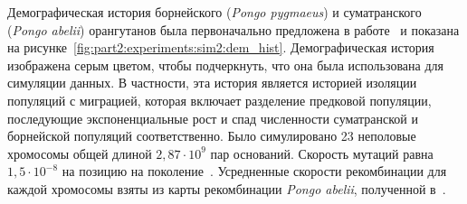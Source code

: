 

Демографическая история борнейского (\textit{Pongo pygmaeus}) и суматранского (\textit{Pongo abelii}) орангутанов была первоначально предложена в работе~\cite{locke2011comparative} и показана на рисунке~\ref{fig:part2:experiments:sim2:dem_hist}.
Демографическая история изображена серым цветом, чтобы подчеркнуть, что она была использована для симуляции данных.
В частности, эта история является историей изоляции популяций с миграцией, которая включает разделение предковой популяции, последующие экспоненциальные рост и спад численности суматранской и борнейской популяций соответственно.
Было симулировано 23 неполовые хромосомы общей длиной $2{,}87\cdot 10^9$ пар оснований.
Скорость мутаций равна $1{,}5\cdot 10^{-8}$ на позицию на поколение~\cite{nater2017morphometric}.
Усредненные скорости рекомбинации для каждой хромосомы взяты из карты рекомбинации \textit{Pongo abelii}, полученной в~\cite{nater2017morphometric}.

